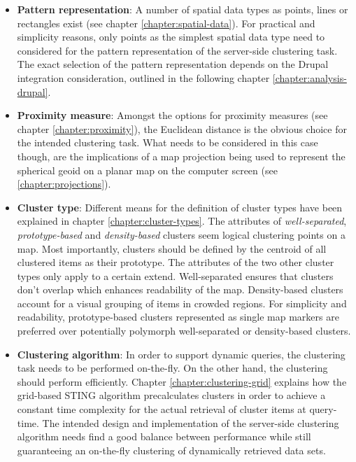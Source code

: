 \begin{itemize}

\item \textbf{Pattern representation}: A number of spatial data types as points, lines or rectangles exist (see chapter \ref{chapter:spatial-data}). For practical and simplicity reasons, only points as the simplest spatial data type need to considered for the pattern representation of the server-side clustering task. The exact selection of the pattern representation depends on the Drupal integration consideration, outlined in the following chapter \ref{chapter:analysis-drupal}.

\item \textbf{Proximity measure}: Amongst the options for proximity measures (see chapter \ref{chapter:proximity}), the Euclidean distance is the obvious choice for the intended clustering task. What needs to be considered in this case though, are the implications of a map projection being used to represent the spherical geoid on a planar map on the computer screen (see \ref{chapter:projections}).

\item \textbf{Cluster type}: Different means for the definition of cluster types have been explained in chapter \ref{chapter:cluster-types}. The attributes of \textit{well-separated}, \textit{prototype-based} and \textit{density-based} clusters seem logical clustering points on a map. Most importantly, clusters should be defined by the centroid of all clustered items as their prototype. The attributes of the two other cluster types only apply to a certain extend. Well-separated ensures that clusters don't overlap which enhances readability of the map. Density-based clusters account for a visual grouping of items in crowded regions. For simplicity and readability, prototype-based clusters represented as single map markers are preferred over potentially polymorph well-separated or density-based clusters.

\item \textbf{Clustering algorithm}: In order to support dynamic queries, the clustering task needs to be performed on-the-fly. On the other hand, the clustering should perform efficiently. Chapter \ref{chapter:clustering-grid} explains how the grid-based STING algorithm precalculates clusters in order to achieve a constant time complexity for the actual retrieval of cluster items at query-time. The intended design and implementation of the server-side clustering algorithm needs find a good balance between performance while still guaranteeing an on-the-fly clustering of dynamically retrieved data sets.

\end{itemize}



